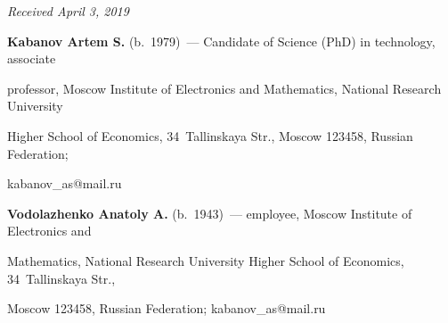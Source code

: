 \hfill{\small\textit{Received April 3, 2019}} 










\Contr





\noindent


\textbf{Kabanov Artem S.} (b.\ 1979)~--- Candidate of Science (PhD) in technology, associate 


professor, Moscow Institute of Electronics and Mathematics, National Research University 


Higher School of Economics, 34~Tallinskaya Str., Moscow 123458, Russian Federation; 


\mbox{kabanov\_as@mail.ru}





\vspace*{3pt}





\noindent


\textbf{Vodolazhenko Anatoly A.} (b.\ 1943)~--- employee, Moscow Institute of Electronics and 


Mathematics, National Research University Higher School of Economics, 34~Tallinskaya Str., 


Moscow 123458, Russian Federation; \mbox{kabanov\_as@mail.ru}


\label{end\stat}





\renewcommand{\bibname}{\protect\rm Литература} 


